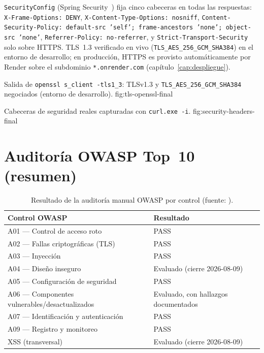 \texttt{SecurityConfig} (Spring Security~\cite{spring-security-docs}) fija
cinco cabeceras en todas las respuestas: \texttt{X-Frame-Options: DENY},
\texttt{X-Content-Type-Options: nosniff},
\texttt{Content-Security-Policy: default-src 'self'; frame-ancestors 'none'; object-src 'none'},
\texttt{Referrer-Policy: no-referrer}, y \texttt{Strict-Transport-Security}
solo sobre HTTPS. TLS~1.3 verificado en vivo
(\texttt{TLS\_AES\_256\_GCM\_SHA384}) en el entorno de desarrollo; en
producci\'on, HTTPS es provisto autom\'aticamente por Render sobre el
subdominio \texttt{*.onrender.com} (cap\'itulo~\ref{cap:despliegue}).

%
{Salida de \texttt{openssl s\_client -tls1\_3}: TLSv1.3 y \texttt{TLS\_AES\_256\_GCM\_SHA384} negociados (entorno de desarrollo).}%
{fig:tls-openssl-final}

%
{Cabeceras de seguridad reales capturadas con \texttt{curl.exe -i}.}%
{fig:security-headers-final}

\section{Auditor\'ia OWASP Top~10 (resumen)}

\begin{table}[H]
  \centering
  \caption{Resultado de la auditor\'ia manual OWASP por control (fuente: ).}
  \label{tab:owasp-final}
  \begin{tabular}{@{}ll@{}}
    \toprule
    Control OWASP & Resultado \\
    \midrule
    A01 --- Control de acceso roto & PASS \\
    A02 --- Fallas criptogr\'aficas (TLS) & PASS \\
    A03 --- Inyecci\'on & PASS \\
    A04 --- Dise\~no inseguro & Evaluado (cierre 2026-08-09) \\
    A05 --- Configuraci\'on de seguridad & PASS \\
    A06 --- Componentes vulnerables/desactualizados & Evaluado, con hallazgos documentados \\
    A07 --- Identificaci\'on y autenticaci\'on & PASS \\
    A09 --- Registro y monitoreo & PASS \\
    XSS (transversal) & Evaluado (cierre 2026-08-09) \\
    \bottomrule
  \end{tabular}
\end{table}


